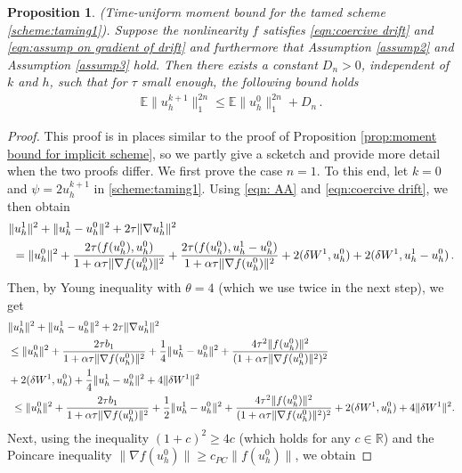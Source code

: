 \documentclass[reqno, 11pt]{amsart}
\theoremstyle{plain}
\newtheorem{proposition}[theorem]{Proposition}
\theoremstyle{definition}
\theoremstyle{remark}
\numberwithin{equation}{section}
\numberwithin{theorem}{section}
\newcommand{\R}{\mathbb{R}}
\begin{document}
{\begin{proposition}\label{them: uniform in time moment bound for tamed}
(Time-uniform moment bound for the tamed scheme \eqref{scheme:taming1}).  Suppose the nonlinearity $f$ satisfies \eqref{eqn:coercive drift} and \eqref{eqn:assump on gradient of drift} and furthermore that Assumption \ref{assump2} and Assumption \ref{assump3} hold. Then there exists a constant  $D_n>0$, independent of $k$ and $h$,  such that for $\tau$ small enough, the following bound holds
\begin{align}
\mathbb{E} \| u_h^{k+1}\|_1^{2n}\leq  \mathbb{E} \| u_h^{0}\|_1^{2n}+D_n \,.
\end{align}
\end{proposition}
\begin{proof}
This proof is in places similar to the proof of Proposition \ref{prop:moment bound for implicit scheme}, so we partly give a scketch and provide more detail when the two proofs differ. 
We first prove the case $n=1$.  
To this end,  let $k=0$ and $\psi=2u_h^{k+1}$ in \eqref{scheme:taming1}. Using \eqref{eqn: AA} and \eqref{eqn:coercive drift}, we then obtain 
\begin{align}\label{first block}
&\|u_h^1\|^2+\|u_h^1-u_h^0\|^2+2\tau\|\nabla u_h^1\|^2\notag\\
&\ =\|u_h^0\|^2+\frac{2\tau(f(u_h^{0}), u_h^0)}{1+\alpha\tau \|\nabla f(u_h^0)\|^2}
+\frac{2\tau(f(u_h^{0}), u_h^1-u_h^0)}{1+\alpha\tau \|\nabla f(u_h^0)\|^2}+2(\delta W^1, u_h^0)+2(\delta W^1, u_h^1-u_h^0) \,.\notag
\end{align}
Then, by Young inequality with $\theta=4$ (which we use twice in the next step), we get
\begin{align}
&\|u_h^1\|^2+\|u_h^1-u_h^0\|^2+2\tau\|\nabla u_h^1\|^2\notag\\
& \leq\|u_h^0\|^2+\frac{2\tau b_1}{1+\alpha\tau \|\nabla f(u_h^0)\|^2}
+\frac{1}{4}\|u_h^1-u_h^0\|^2+\frac{4\tau^2\|f(u_h^{0})\|^2}{(1+\alpha\tau\|\nabla f(u_h^0)\|^2)^2}\notag\\
&+2(\delta W^1, u_h^0)+\frac{1}{4}\|u_h^1-u_h^0\|^2+4\|\delta W^1\|^2\notag\\
&\ \leq \|u_h^0\|^2+\frac{2\tau b_1}{1+\alpha\tau\|\nabla f(u_h^0)\|^2}+\frac{1}{2}\|u_h^1-u_h^0\|^2
+\frac{4\tau^2\|f(u_h^{0})\|^2}{(1+\alpha\tau\|\nabla f(u_h^0)\|^2)^2}+2(\delta W^1, u_h^0)+4\|\delta W^1\|^2.
\end{align}
Next, using the inequality $(1+c)^2\geq 4c$ (which holds for any $c\in\R$) and the Poincare inequality $\|\nabla f(u_h^0)\|\geq c_{PC}\|f(u_h^0)\|$, we obtain

\end{proof}}
\end{document}
